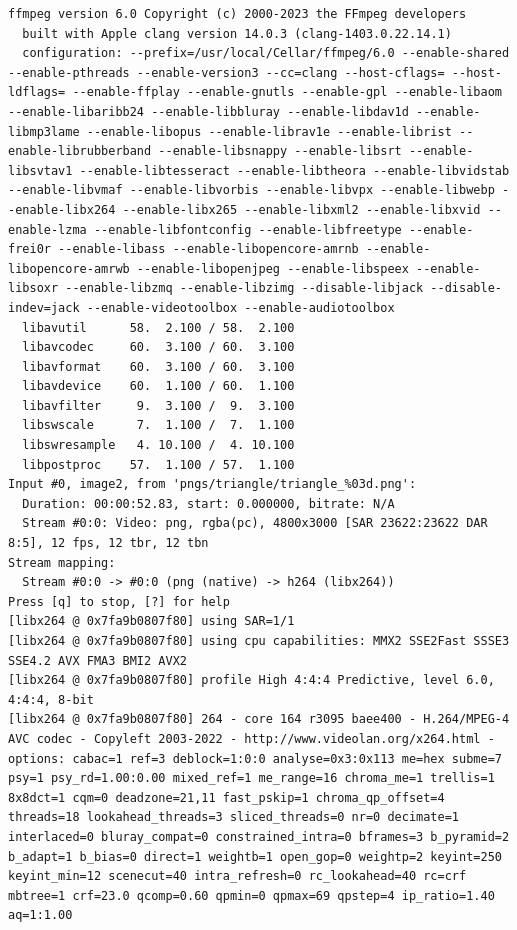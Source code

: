 \documentclass[
  letterpaper,
  DIV=11,
  numbers=noendperiod,
  oneside]{scrreprt}
\begin{document}
\begin{verbatim}
ffmpeg version 6.0 Copyright (c) 2000-2023 the FFmpeg developers
  built with Apple clang version 14.0.3 (clang-1403.0.22.14.1)
  configuration: --prefix=/usr/local/Cellar/ffmpeg/6.0 --enable-shared --enable-pthreads --enable-version3 --cc=clang --host-cflags= --host-ldflags= --enable-ffplay --enable-gnutls --enable-gpl --enable-libaom --enable-libaribb24 --enable-libbluray --enable-libdav1d --enable-libmp3lame --enable-libopus --enable-librav1e --enable-librist --enable-librubberband --enable-libsnappy --enable-libsrt --enable-libsvtav1 --enable-libtesseract --enable-libtheora --enable-libvidstab --enable-libvmaf --enable-libvorbis --enable-libvpx --enable-libwebp --enable-libx264 --enable-libx265 --enable-libxml2 --enable-libxvid --enable-lzma --enable-libfontconfig --enable-libfreetype --enable-frei0r --enable-libass --enable-libopencore-amrnb --enable-libopencore-amrwb --enable-libopenjpeg --enable-libspeex --enable-libsoxr --enable-libzmq --enable-libzimg --disable-libjack --disable-indev=jack --enable-videotoolbox --enable-audiotoolbox
  libavutil      58.  2.100 / 58.  2.100
  libavcodec     60.  3.100 / 60.  3.100
  libavformat    60.  3.100 / 60.  3.100
  libavdevice    60.  1.100 / 60.  1.100
  libavfilter     9.  3.100 /  9.  3.100
  libswscale      7.  1.100 /  7.  1.100
  libswresample   4. 10.100 /  4. 10.100
  libpostproc    57.  1.100 / 57.  1.100
Input #0, image2, from 'pngs/triangle/triangle_%03d.png':
  Duration: 00:00:52.83, start: 0.000000, bitrate: N/A
  Stream #0:0: Video: png, rgba(pc), 4800x3000 [SAR 23622:23622 DAR 8:5], 12 fps, 12 tbr, 12 tbn
Stream mapping:
  Stream #0:0 -> #0:0 (png (native) -> h264 (libx264))
Press [q] to stop, [?] for help
[libx264 @ 0x7fa9b0807f80] using SAR=1/1
[libx264 @ 0x7fa9b0807f80] using cpu capabilities: MMX2 SSE2Fast SSSE3 SSE4.2 AVX FMA3 BMI2 AVX2
[libx264 @ 0x7fa9b0807f80] profile High 4:4:4 Predictive, level 6.0, 4:4:4, 8-bit
[libx264 @ 0x7fa9b0807f80] 264 - core 164 r3095 baee400 - H.264/MPEG-4 AVC codec - Copyleft 2003-2022 - http://www.videolan.org/x264.html - options: cabac=1 ref=3 deblock=1:0:0 analyse=0x3:0x113 me=hex subme=7 psy=1 psy_rd=1.00:0.00 mixed_ref=1 me_range=16 chroma_me=1 trellis=1 8x8dct=1 cqm=0 deadzone=21,11 fast_pskip=1 chroma_qp_offset=4 threads=18 lookahead_threads=3 sliced_threads=0 nr=0 decimate=1 interlaced=0 bluray_compat=0 constrained_intra=0 bframes=3 b_pyramid=2 b_adapt=1 b_bias=0 direct=1 weightb=1 open_gop=0 weightp=2 keyint=250 keyint_min=12 scenecut=40 intra_refresh=0 rc_lookahead=40 rc=crf mbtree=1 crf=23.0 qcomp=0.60 qpmin=0 qpmax=69 qpstep=4 ip_ratio=1.40 aq=1:1.00

\end{verbatim}
\end{document}

